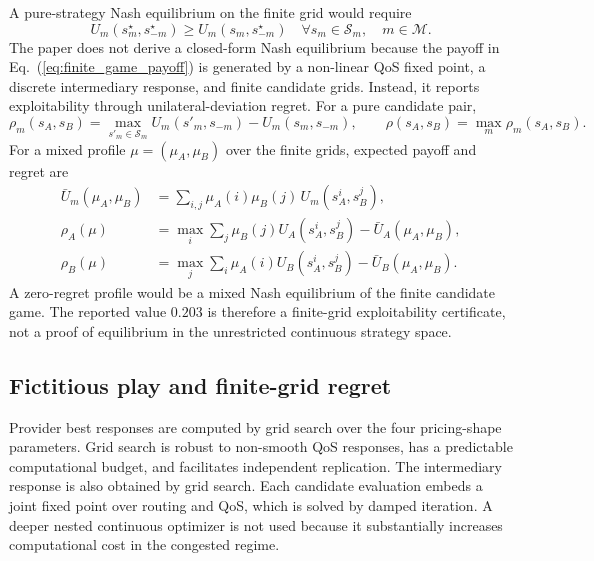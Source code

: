 \documentclass[11pt,a4paper]{article}
\newcommand{\M}{\mathcal{M}}
\begin{document}
A pure-strategy Nash equilibrium on the finite grid would require
\begin{equation}
  U_m(s_m^\star,s_{-m}^\star)
  \ge
  U_m(s_m,s_{-m}^\star)
  \quad
  \forall s_m\in\mathcal S_m,\quad m\in\M .
  \label{eq:pure_nash}
\end{equation}
The paper does not derive a closed-form Nash equilibrium because the payoff in Eq.~(\ref{eq:finite_game_payoff}) is generated by a non-linear QoS fixed point, a discrete intermediary response, and finite candidate grids. Instead, it reports exploitability through unilateral-deviation regret. For a pure candidate pair,
\begin{equation}
  \rho_m(s_A,s_B)
  =
  \max_{s'_m\in\mathcal S_m}U_m(s'_m,s_{-m})
  -U_m(s_m,s_{-m}),
  \qquad
  \rho(s_A,s_B)=\max_m\rho_m(s_A,s_B).
  \label{eq:pure_regret}
\end{equation}
For a mixed profile $\mu=(\mu_A,\mu_B)$ over the finite grids, expected payoff and regret are
\begin{align}
  \bar U_m(\mu_A,\mu_B)
  &=
  \sum_{i,j}\mu_A(i)\mu_B(j)\,U_m(s_A^i,s_B^j), \label{eq:mixed_payoff}\\
  \rho_A(\mu)
  &=
  \max_i\sum_j\mu_B(j)U_A(s_A^i,s_B^j)
  -\bar U_A(\mu_A,\mu_B), \nonumber\\
  \rho_B(\mu)
  &=
  \max_j\sum_i\mu_A(i)U_B(s_A^i,s_B^j)
  -\bar U_B(\mu_A,\mu_B). \label{eq:mixed_regret}
\end{align}
A zero-regret profile would be a mixed Nash equilibrium of the finite candidate game. The reported value $0.203$ is therefore a finite-grid exploitability certificate, not a proof of equilibrium in the unrestricted continuous strategy space.

\subsection{Fictitious play and finite-grid regret}

Provider best responses are computed by grid search over the four pricing-shape parameters. Grid search is robust to non-smooth QoS responses, has a predictable computational budget, and facilitates independent replication. The intermediary response is also obtained by grid search. Each candidate evaluation embeds a joint fixed point over routing and QoS, which is solved by damped iteration. A deeper nested continuous optimizer is not used because it substantially increases computational cost in the congested regime.
\end{document}
